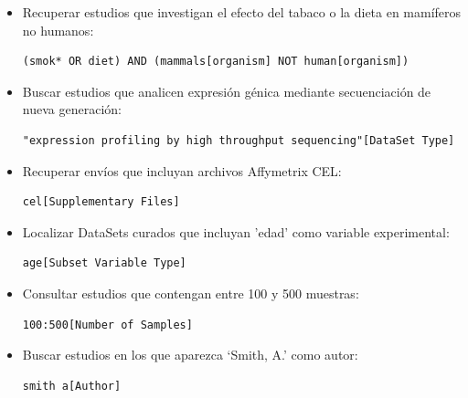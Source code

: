 \begin{itemize}
    \item Recuperar estudios que investigan el efecto del tabaco o la dieta en mamíferos no humanos:
    \begin{lstlisting}[basicstyle=\ttfamily\small, backgroundcolor=\color{lightgray}, numbers=none, aboveskip=0pt, belowskip=0pt]
(smok* OR diet) AND (mammals[organism] NOT human[organism])\end{lstlisting}

    \item Buscar estudios que analicen expresión génica mediante secuenciación de nueva generación:
    \begin{lstlisting}[basicstyle=\ttfamily\small, backgroundcolor=\color{lightgray}, numbers=none, aboveskip=0pt, belowskip=0pt]
"expression profiling by high throughput sequencing"[DataSet Type]\end{lstlisting}

    \item Recuperar envíos que incluyan archivos Affymetrix CEL:
    \begin{lstlisting}[basicstyle=\ttfamily\small, backgroundcolor=\color{lightgray}, numbers=none, aboveskip=0pt, belowskip=0pt]
cel[Supplementary Files]\end{lstlisting}

    \item Localizar DataSets curados que incluyan 'edad' como variable experimental:
    \begin{lstlisting}[basicstyle=\ttfamily\small, backgroundcolor=\color{lightgray}, numbers=none, aboveskip=0pt, belowskip=0pt]
age[Subset Variable Type]\end{lstlisting}

    \item Consultar estudios que contengan entre 100 y 500 muestras:
    \begin{lstlisting}[basicstyle=\ttfamily\small, backgroundcolor=\color{lightgray}, numbers=none, aboveskip=0pt, belowskip=0pt]
100:500[Number of Samples]\end{lstlisting}

    \item Buscar estudios en los que aparezca ‘Smith, A.’ como autor:
    \begin{lstlisting}[basicstyle=\ttfamily\small, backgroundcolor=\color{lightgray}, numbers=none, aboveskip=0pt, belowskip=0pt]
smith a[Author]\end{lstlisting}

\end{itemize}

